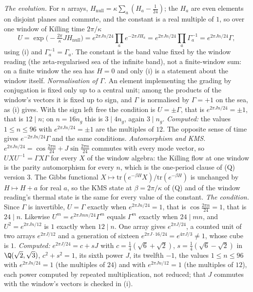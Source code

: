 \emph{The evolution.} For $n$ arrays, $H_{\mathrm{null}} = \kappa\sum_{a}(H_{a} - \tfrac1{24})$; the $H_{a}$ are even elements on disjoint planes and commute, and the constant is a real multiple of $1$, so over one window of Killing time $2\pi/\kappa$
\[
U = \exp\bigl(-\tfrac{2\pi}{\kappa}JH_{\mathrm{null}}\bigr) = e^{2\pi Jn/24}\prod_{a}e^{-2\pi JH_{a}} = e^{2\pi Jn/24}\prod_{a}\Gamma_{a}^{-1} = e^{2\pi Jn/24}\Gamma ,
\]
using (i) and $\Gamma_{a}^{-1} = \Gamma_{a}$. The constant is the band value fixed by the window reading (the zeta-regularised sea of the infinite band), not a finite-window sum: on a finite window the sea has $H = 0$ and only (i) is a statement about the window itself. \emph{Normalisation of $\Gamma$.} An element implementing the grading by conjugation is fixed only up to a central unit; among the products of the window's vectors it is fixed up to sign, and $\Gamma$ is normalised by $\Gamma = +1$ on the sea, as (i) gives. With the sign left free the condition is $U = \pm\Gamma$, that is $e^{2\pi Jn/24} = \pm1$, that is $12 \mid n$; on $n = 16n_{g}$ this is $3 \mid 4n_{g}$, again $3 \mid n_{g}$. \emph{Computed:} the values $1 \le n \le 96$ with $e^{2\pi Jn/24} = \pm1$ are the multiples of $12$. The opposite sense of time gives $e^{-2\pi Jn/24}\Gamma$ and the same conditions. \emph{Automorphism and KMS.} $e^{2\pi Jn/24} = \cos\tfrac{2\pi n}{24} + J\sin\tfrac{2\pi n}{24}$ commutes with every mode vector, so $UXU^{-1} = \Gamma X\Gamma$ for every $X$ of the window algebra: the Killing flow at one window is the parity automorphism for every $n$, which is the one-period clause of (Q) version 3. The Gibbs functional $X \mapsto \mathrm{tr}(e^{-\beta H}X)/\mathrm{tr}(e^{-\beta H})$ is unchanged by $H \mapsto H + a$ for real $a$, so the KMS state at $\beta = 2\pi/\kappa$ of (Q) and of the window reading's thermal state is the same for every value of the constant. \emph{The condition.} Since $\Gamma$ is invertible, $U = \Gamma$ exactly when $e^{2\pi Jn/24} = 1$, that is $\cos\tfrac{2\pi n}{24} = 1$, that is $24 \mid n$. Likewise $U^{m} = e^{2\pi Jmn/24}\Gamma^{m}$ equals $\Gamma^{m}$ exactly when $24 \mid mn$, and $U^{2} = e^{2\pi Jn/12}$ is $1$ exactly when $12 \mid n$. One array gives $e^{2\pi J/24}$, a counted unit of two arrays $e^{2\pi J/12}$ and a generation of sixteen $e^{2\pi J\cdot 16/24} = e^{4\pi J/3} \neq 1$, whose cube is $1$. \emph{Computed:} $e^{2\pi J/24} = c + sJ$ with $c = \tfrac14(\sqrt6 + \sqrt2)$, $s = \tfrac14(\sqrt6 - \sqrt2)$ in $\Q(\sqrt2, \sqrt3)$, $c^{2} + s^{2} = 1$, its sixth power $J$, its twelfth $-1$, the values $1 \le n \le 96$ with $e^{2\pi Jn/24} = 1$ (the multiples of $24$) and with $e^{2\pi Jn/12} = 1$ (the multiples of $12$), each power computed by repeated multiplication, not reduced; that $J$ commutes with the window's vectors is checked in (i).

